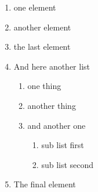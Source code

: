 \begin{appendices}
\begin{enumerate}[label=\arabic*)]
    \item one element
    \item another element
    \item the last element
    \item And here another list
    \begin{enumerate}
        \item one thing
        \item another thing
        \item and another one
        \begin{enumerate}
            \item sub list first
            \item sub list second
        \end{enumerate}
    \end{enumerate}
    \item The final element
\end{enumerate}

\end{appendices}